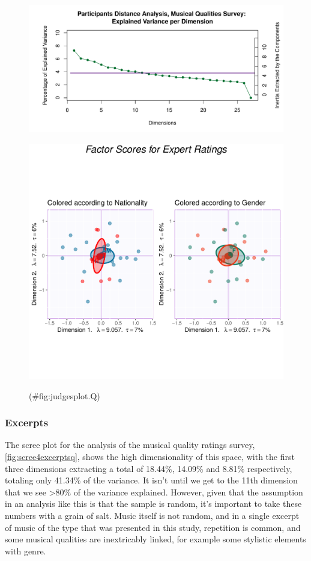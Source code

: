 \documentclass[
  english,
  man,floatsintext]{apa6}
\begin{document}
\begin{figure}

{\centering \includegraphics{Music-Descriptor-Space_files/figure-latex/screeRV-1} 

}

\caption{ }\label{fig:screeRV}
\end{figure}

\begin{figure}

{\centering \includegraphics[width=0.5\linewidth]{Music-Descriptor-Space_files/figure-latex/judgesplot.Q-1} 

}

\caption{ }(\#fig:judgesplot.Q)
\end{figure}

\hypertarget{excerpts}{%
\subsubsection{Excerpts}\label{excerpts}}

The scree plot for the analysis of the musical quality ratings survey, \ref{fig:scree4excerptsq}, shows the high dimensionality of this space, with the first three dimensions extracting a total of 18.44\%, 14.09\% and 8.81\% respectively, totaling only 41.34\% of the variance. It isn't until we get to the 11th dimension that we see \textgreater80\% of the variance explained. However, given that the assumption in an analysis like this is that the sample is random, it's important to take these numbers with a grain of salt. Music itself is not random, and in a single excerpt of music of the type that was presented in this study, repetition is common, and some musical qualities are inextricably linked, for example some stylistic elements with genre.
\end{document}
